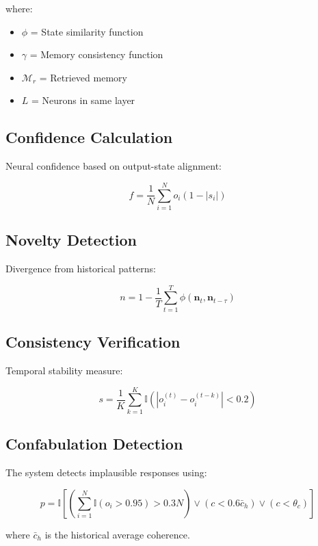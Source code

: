 \documentclass{article}
\begin{document}
where:
\begin{itemize}[leftmargin=*]
\item $\phi$ = State similarity function
\item $\gamma$ = Memory consistency function
\item $\mathcal{M}_r$ = Retrieved memory
\item $L$ = Neurons in same layer
\end{itemize}

\subsection{Confidence Calculation}
Neural confidence based on output-state alignment:

\begin{equation}
f = \frac{1}{N}\sum_{i=1}^N o_i(1-|s_i|)
\end{equation}

\subsection{Novelty Detection}
Divergence from historical patterns:

\begin{equation}
n = 1 - \frac{1}{T}\sum_{t=1}^T \phi(\mathbf{n}_t, \mathbf{n}_{t-\tau})
\end{equation}

\subsection{Consistency Verification}
Temporal stability measure:

\begin{equation}
s = \frac{1}{K}\sum_{k=1}^K \mathbb{I}(|o_i^{(t)} - o_i^{(t-k)}| < 0.2)
\end{equation}

\subsection{Confabulation Detection}

The system detects implausible responses using:

\begin{equation}
p = \mathbb{I}\left[\left(\sum_{i=1}^N \mathbb{I}(o_i>0.95) > 0.3N\right) \lor (c < 0.6\bar{c}_h) \lor (c < \theta_c)\right]
\end{equation}

where $\bar{c}_h$ is the historical average coherence.
\end{document}
